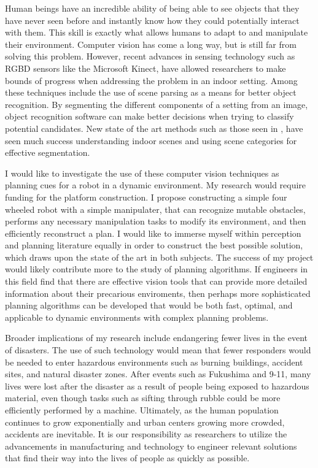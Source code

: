 \documentclass[10pt]{article}
\begin{document}
Human beings have an incredible ability of being able to see objects that they
have never seen before and instantly know how they could potentially interact
with them. This skill is exactly what allows humans to adapt to and manipulate
their environment. Computer vision has come a long way, but is still far from
solving this problem. However, recent advances in sensing technology such as
RGBD sensors like the Microsoft Kinect, have allowed researchers to make bounds
of progress when addressing the problem in an indoor setting. Among these
techniques include the use of scene parsing as a means for better object
recognition. By segmenting the different components of a setting from an image,
object recognition software can make better decisions when trying to classify
potential candidates. New state of the art methods such as those seen in
\cite{gupta}, have seen much success understanding indoor scenes and using
scene categories for effective segmentation.

I would like to investigate the use of these computer vision techniques as
planning cues for a robot in a dynamic environment. My research would require
funding for the platform construction. I propose constructing a simple four
wheeled robot with a simple manipulater, that can recognize mutable obstacles,
performs any necessary manipulation tasks to modify its environment, and then
efficiently reconstruct a plan. I would like to immerse myself within
perception and planning literature equally in order to construct the best
possible solution, which draws upon the state of the art in both subjects. The
success of my project would likely contribute more to the study of planning
algorithms. If engineers in this field find that there are effective vision
tools that can provide more detailed information about their precarious
enviroments, then perhaps more sophisticated planning algorithms can be
developed that would be both fast, optimal, and applicable to dynamic
environments with complex planning problems.

Broader implications of my research include endangering fewer lives in the
event of disasters. The use of such technology would mean that fewer responders
would be needed to enter hazardous environments such as burning buildings,
accident sites, and natural disaster zones. After events such as Fukushima and
9-11, many lives were lost after the disaster as a result of people being
exposed to hazardous material, even though tasks such as sifting through rubble
could be more efficiently performed by a machine. Ultimately, as the human
population continues to grow exponentially and urban centers growing more
crowded, accidents are inevitable. It is our responsibility as researchers to
utilize the advancements in manufacturing and technology to engineer relevant
solutions that find their way into the lives of people as quickly as possible.
\end{document}
